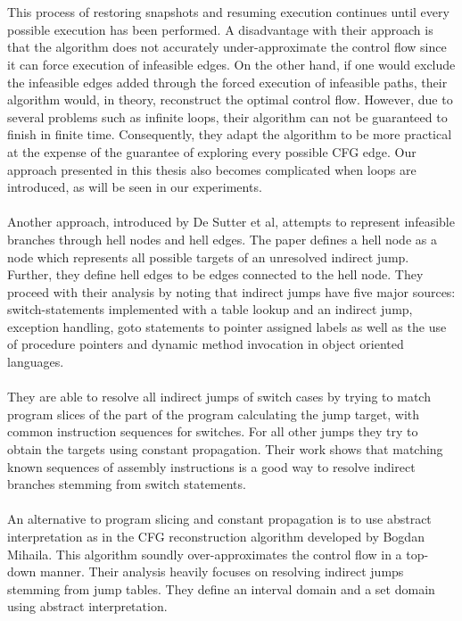 \documentclass{kththesis}
\begin{document}
\\ \\
This process of restoring snapshots and resuming execution continues until every possible execution has been performed. A disadvantage with their approach is that the algorithm does not accurately under-approximate the control flow since it can force execution of infeasible edges. On the other hand, if one would exclude the infeasible edges added through the forced execution of infeasible paths, their algorithm would, in theory, reconstruct the optimal control flow. However, due to several problems such as infinite loops, their algorithm can not be guaranteed to finish in finite time. Consequently, they adapt the algorithm to be more practical at the expense of the guarantee of exploring every possible CFG edge. Our approach presented in this thesis also becomes complicated when loops are introduced, as will be seen in our experiments.
\\ \\
Another approach, introduced by De Sutter et al\cite{staticOfInd}, attempts to represent infeasible branches through hell nodes and hell edges. The paper defines a hell node as a node which represents all possible targets of an unresolved indirect jump. Further, they define hell edges to be edges connected to the hell node. They proceed with their analysis by noting that indirect jumps have five major sources: switch-statements implemented with a table lookup and an indirect jump, exception handling, goto statements to pointer assigned labels as well as the use of procedure pointers and dynamic method invocation in object oriented languages. 
\\ \\
They are able to resolve all indirect jumps of switch cases by trying to match program slices of the part of the program calculating the jump target, with common instruction sequences for switches. For all other jumps they try to obtain the targets using constant propagation. Their work shows that matching known sequences of assembly instructions is a good way to resolve indirect branches stemming from switch statements. 
\\ \\
An alternative to program slicing and constant propagation is to use abstract interpretation as in the CFG reconstruction algorithm developed by Bogdan Mihaila\parencite{CFGFromPowerPC}. This algorithm soundly over-approximates the control flow in a top-down manner. Their analysis heavily focuses on resolving indirect jumps stemming from jump tables. They define an interval domain and a set domain using abstract interpretation. 
\end{document}
